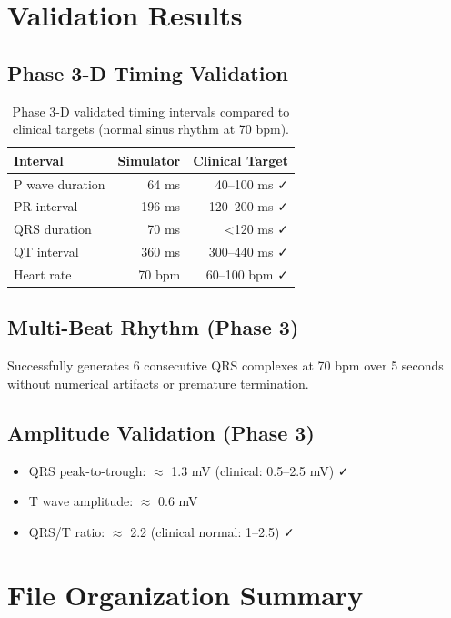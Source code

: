 \documentclass[12pt,a4paper,oneside]{book}
\begin{document}
\section{Validation Results}

\subsection{Phase 3-D Timing Validation}

\begin{table}[H]
    \centering
    \begin{tabular}{|l|r|r|}
    \hline
    \textbf{Interval} & \textbf{Simulator} & \textbf{Clinical Target} \\
    \hline
    P wave duration & 64 ms & 40--100 ms ✓ \\
    PR interval & 196 ms & 120--200 ms ✓ \\
    QRS duration & 70 ms & <120 ms ✓ \\
    QT interval & 360 ms & 300--440 ms ✓ \\
    Heart rate & 70 bpm & 60--100 bpm ✓ \\
    \hline
    \end{tabular}
    \caption{Phase 3-D validated timing intervals compared to clinical targets (normal sinus rhythm at 70 bpm).}
    \label{tab:timing_validation}
\end{table}

\subsection{Multi-Beat Rhythm (Phase 3)}

Successfully generates 6 consecutive QRS complexes at 70 bpm over 5 seconds without numerical artifacts or premature termination.

\subsection{Amplitude Validation (Phase 3)}

\begin{itemize}
    \item QRS peak-to-trough: $\approx$ 1.3 mV (clinical: 0.5--2.5 mV) ✓
    \item T wave amplitude: $\approx$ 0.6 mV
    \item QRS/T ratio: $\approx$ 2.2 (clinical normal: 1--2.5) ✓
\end{itemize}

\section{File Organization Summary}
\end{document}
